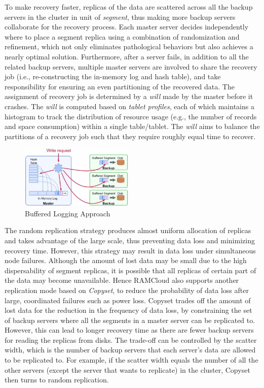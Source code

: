 \documentclass[twocolumn]{article}
\begin{document}
To make recovery faster, replicas of the data are scattered across all
the backup servers in the cluster in unit of \emph{segment}, thus making
more backup servers collaborate for the recovery process. Each master
server decides independently where to place a segment replica using a
combination of randomization and refinement, which not only eliminates
pathological behaviors but also achieves a nearly optimal solution.
Furthermore, after a server fails, in addition to all the related backup
servers, multiple master servers are involved to share the recovery job
(i.e., re-constructing the in-memory log and hash table), and take
responsibility for ensuring an even partitioning of the recovered data.
The assignment of recovery job is determined by a \emph{will} made by
the master before it crashes. The \emph{will} is computed based on
\emph{tablet profiles}, each of which maintains a histogram to track the
distribution of resource usage (e.g., the number of records and space
consumption) within a single table/tablet. The \emph{will} aims to
balance the partitions of a recovery job such that they require roughly
equal time to recover.

\begin{figure}[htb]
        \centering
        \includegraphics[width=0.48\textwidth]{buffered_logging.png}
        \caption{Buffered Logging Approach}
        \label{fig:buffered_logging}
\end{figure}

The random replication strategy produces almost uniform allocation of
replicas and takes advantage of the large scale, thus preventing data
loss and minimizing recovery
time. However,
this strategy may result in data loss under simultaneous node failures. 
Although the amount of lost data may
be small due to the high dispersability of segment replicas, it is
possible that all replicas of certain part of the data may become
unavailable. 
Hence RAMCloud
also supports another replication mode based on \emph{Copyset}, to reduce the probability of data loss
after large, coordinated failures such as power loss. Copyset trades off
the amount of lost data for the reduction in the frequency of data loss,
by constraining the set of backup servers where all the segments in a
master server can be replicated to. However, this can lead to longer
recovery time as there are fewer backup servers for reading the replicas
from disks. The trade-off can be controlled by the scatter width, which
is the number of backup servers that each server's data are allowed to
be replicated to. For example, if the scatter width equals the number of
all the other servers (except the server that wants to replicate) in the
cluster, Copyset then turns to random replication.
\end{document}
